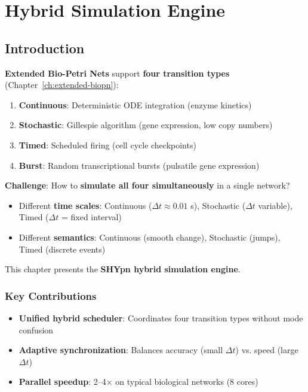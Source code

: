 \chapter{Hybrid Simulation Engine}
\label{ch:simulation}

\section{Introduction}
\label{sec:simulation-intro}

\textbf{Extended Bio-Petri Nets} support \textbf{four transition types} (Chapter~\ref{ch:extended-biopn}):

\begin{enumerate}
    \item \textbf{Continuous}: Deterministic ODE integration (enzyme kinetics)
    \item \textbf{Stochastic}: Gillespie algorithm (gene expression, low copy numbers)
    \item \textbf{Timed}: Scheduled firing (cell cycle checkpoints)
    \item \textbf{Burst}: Random transcriptional bursts (pulsatile gene expression)
\end{enumerate}

\textbf{Challenge}: How to \textbf{simulate all four simultaneously} in a single network?

\begin{itemize}
    \item Different \textbf{time scales}: Continuous ($\Delta t \approx 0.01$ s), Stochastic ($\Delta t$ variable), Timed ($\Delta t$ = fixed interval)
    \item Different \textbf{semantics}: Continuous (smooth change), Stochastic (jumps), Timed (discrete events)
\end{itemize}

This chapter presents the \textbf{SHYpn hybrid simulation engine}.

\subsection{Key Contributions}
\label{subsec:simulation-contributions}

\begin{itemize}
    \item \textbf{Unified hybrid scheduler}: Coordinates four transition types without mode confusion
    \item \textbf{Adaptive synchronization}: Balances accuracy (small $\Delta t$) vs. speed (large $\Delta t$)
    \item \textbf{Parallel speedup}: 2--4$\times$ on typical biological networks (8 cores)
\end{itemize}

